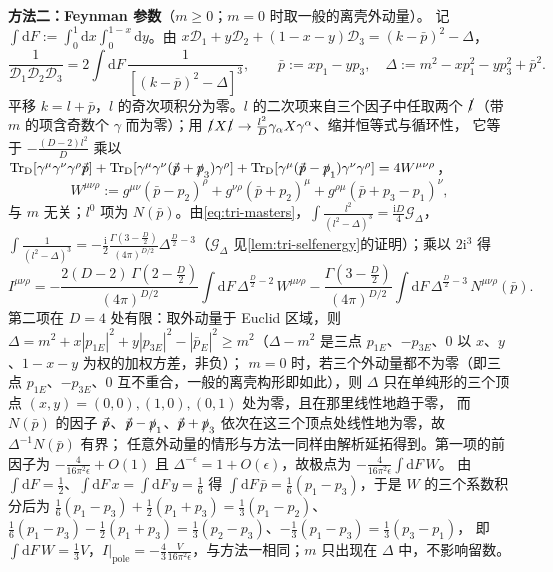 \documentclass[UTF8,a4paper,11pt,fontset=fandol]{ctexart}
\makeatletter
\theoremstyle{cplain}
\theoremstyle{cdefinition}
\theoremstyle{cremark}
\renewcommand{\proofname}{证明}
\renewenvironment{proof}[1][\proofname]{\par\pushQED{\qed}\normalfont\topsep6\p@\@plus6\p@\relax
  \trivlist\item[\hskip\labelsep\itshape #1\hspace{0.5em}]\ignorespaces}{\popQED\endtrivlist\@endpefalse}
\numberwithin{equation}{section}
\newcommand{\TrD}{\operatorname{Tr}_{\mathrm{D}}}   %
\newcommand{\sla}[1]{\slashed{#1}}                  %
\newcommand{\dd}{\mathrm{d}}                         %
\newcommand{\ii}{\mathrm{i}}                        %
\makeatother
\begin{document}
\begin{proof}[{\cref{prop:triangle}(iv) 的证明}]
\smallskip\noindent\textbf{方法二：Feynman 参数}（$m\ge0$；$m=0$ 时取一般的离壳外动量）。
记 $\int\dd F:=\int_0^1\dd x\int_0^{1-x}\dd y$。由 $x\mathcal D_1+y\mathcal D_2+(1-x-y)\mathcal D_3=(k-\bar p)^2-\Delta$，
\begin{equation}\label{eq:tri-feynpar}
\frac{1}{\mathcal D_1\mathcal D_2\mathcal D_3}=2\!\int\!\dd F\,\frac{1}{[(k-\bar p)^2-\Delta]^3},\qquad \bar p:=xp_1-yp_3,\quad \Delta:=m^2-xp_1^2-yp_3^2+\bar p^2 .
\end{equation}
平移 $k=l+\bar p$，$l$ 的奇次项积分为零。$l$ 的二次项来自三个因子中任取两个 $\sla l$（带 $m$ 的项含奇数个 $\gamma$ 而为零）；用 $\sla lX\sla l\to\frac{l^2}{D}\gamma_\alpha X\gamma^\alpha$、缩并恒等式与循环性，
它等于 $-\frac{(D-2)l^2}{D}$ 乘以 $\TrD[\gamma^\mu\gamma^\nu\gamma^\rho\sla{\bar p}]+\TrD[\gamma^\mu\gamma^\nu(\sla{\bar p}+\sla p_3)\gamma^\rho]+\TrD[\gamma^\mu(\sla{\bar p}-\sla p_1)\gamma^\nu\gamma^\rho]=4W^{\mu\nu\rho}$，
\begin{equation}\label{eq:tri-W}
W^{\mu\nu\rho}:=g^{\mu\nu}(\bar p-p_2)^\rho+g^{\nu\rho}(\bar p+p_2)^\mu+g^{\rho\mu}(\bar p+p_3-p_1)^\nu ,
\end{equation}
与 $m$ 无关；$l^0$ 项为 $N(\bar p)$。由\cref{eq:tri-masters}，$\int\frac{l^2}{(l^2-\Delta)^3}=\frac{\ii D}{4}\mathcal G_\Delta$，$\int\frac{1}{(l^2-\Delta)^3}=-\frac{\ii}{2}\frac{\Gamma(3-\frac D2)}{(4\pi)^{D/2}}\Delta^{\frac D2-3}$（$\mathcal G_\Delta$ 见\cref{lem:tri-selfenergy}的证明）；乘以 $2\ii^3$ 得
\begin{equation}\label{eq:tri-feyn}
I^{\mu\nu\rho}=-\frac{2(D-2)\,\Gamma(2-\frac D2)}{(4\pi)^{D/2}}\int\dd F\,\Delta^{\frac D2-2}\,W^{\mu\nu\rho}
-\frac{\Gamma(3-\frac D2)}{(4\pi)^{D/2}}\int\dd F\,\Delta^{\frac D2-3}\,N^{\mu\nu\rho}(\bar p).
\end{equation}
第二项在 $D=4$ 处有限：取外动量于 Euclid 区域，则 $\Delta=m^2+x|p_{1E}|^2+y|p_{3E}|^2-|\bar p_E|^2\ge m^2$（$\Delta-m^2$ 是三点 $p_{1E}$、$-p_{3E}$、$0$ 以 $x$、$y$、$1-x-y$ 为权的加权方差，非负）；
$m=0$ 时，若三个外动量都不为零（即三点 $p_{1E}$、$-p_{3E}$、$0$ 互不重合，一般的离壳构形即如此），则 $\Delta$ 只在单纯形的三个顶点 $(x,y)=(0,0),(1,0),(0,1)$ 处为零，且在那里线性地趋于零，
而 $N(\bar p)$ 的因子 $\sla{\bar p}$、$\sla{\bar p}-\sla p_1$、$\sla{\bar p}+\sla p_3$ 依次在这三个顶点处线性地为零，故 $\Delta^{-1}N(\bar p)$ 有界；
任意外动量的情形与方法一同样由解析延拓得到。第一项的前因子为 $-\frac{4}{16\pi^2\epsilon}+O(1)$ 且 $\Delta^{-\epsilon}=1+O(\epsilon)$，故极点为 $-\frac{4}{16\pi^2\epsilon}\int\dd F\,W$。
由 $\int\dd F=\frac12$、$\int\dd F\,x=\int\dd F\,y=\frac16$ 得 $\int\dd F\,\bar p=\frac16(p_1-p_3)$，于是 $W$ 的三个系数积分后为
$\frac16(p_1-p_3)+\frac12(p_1+p_3)=\frac13(p_1-p_2)$、$\frac16(p_1-p_3)-\frac12(p_1+p_3)=\frac13(p_2-p_3)$、$-\frac13(p_1-p_3)=\frac13(p_3-p_1)$，
即 $\int\dd F\,W=\frac13V$，$I|_{\mathrm{pole}}=-\frac43\frac{V}{16\pi^2\epsilon}$，与方法一相同；$m$ 只出现在 $\Delta$ 中，不影响留数。


\end{proof}
\end{document}
